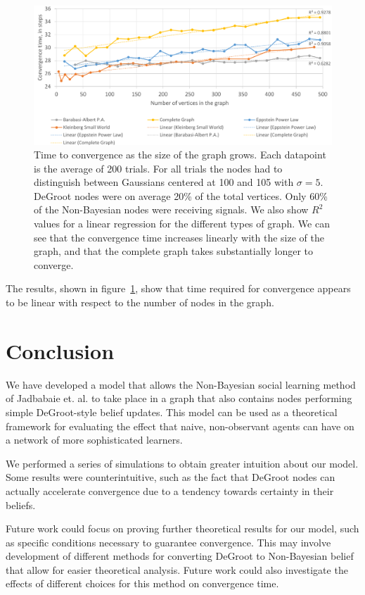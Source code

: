 \documentclass[letterpaper, 11pt, conference]{ieeeconf}
\begin{document}
\begin{figure}[h]
\centering
\includegraphics[width=.9\textwidth]{figures/convergence_time}
\caption{Time to convergence as the size of the graph grows. Each datapoint is the average of 200 trials. For all trials the nodes had to distinguish between Gaussians centered at 100 and 105 with $\sigma=5$. DeGroot nodes were on average 20\% of the total vertices. Only 60\% of the Non-Bayesian nodes were receiving signals. We also show $R^2$ values for a linear regression for the different types of graph. We can see that the convergence time increases linearly with the size of the graph, and that the complete graph takes substantially longer to converge. }
\label{fig:convergence_time}
\end{figure}

The results, shown in figure~\ref{fig:convergence_time}, show that time required for convergence appears to be linear with respect to the number of nodes in the graph.

\section{Conclusion}

We have developed a model that allows the Non-Bayesian social learning method of Jadbabaie et. al. to take place in a graph that also contains nodes performing simple DeGroot-style belief updates.  This model can be used as a theoretical framework for evaluating the effect that naive, non-observant agents can have on a network of more sophisticated learners.

We performed a series of simulations to obtain greater intuition about our model.  Some results were counterintuitive, such as the fact that DeGroot nodes can actually accelerate convergence due to a tendency towards certainty in their beliefs.

Future work could focus on proving further theoretical results for our model, such as specific conditions necessary to guarantee convergence.  This may involve development of different methods for converting DeGroot to Non-Bayesian belief that allow for easier theoretical analysis.  Future work could also investigate the effects of different choices for this method on convergence time.



\end{document}
